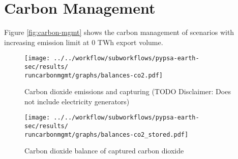 \section{Carbon Management}
\label{subsec:carbon_mgmt}

Figure \ref{fig:carbon-mgmt} shows the carbon management of scenarios with increasing emission limit at 0 TWh export volume.


\begin{figure*}[h!] %
    \centering
    \begin{subfigure}[b]{0.49\linewidth}
        \centering
        \texttt{[image: ../../workflow/subworkflows/pypsa-earth-sec/results/\\runcarbonmgmt/graphs/balances-co2.pdf]}
        \caption{Carbon dioxide emissions and capturing (TODO Disclaimer: Does not include electricity generators)}
        \label{fig:carbon-atmo}
    \end{subfigure}
    \hfill
    \begin{subfigure}[b]{0.49\linewidth}
        \centering
        \texttt{[image: ../../workflow/subworkflows/pypsa-earth-sec/results/\\runcarbonmgmt/graphs/balances-co2\_stored.pdf]}
        \caption{Carbon dioxide balance of captured carbon dioxide}
        \label{fig:carbon-store}
    \end{subfigure}
    \hfill
    \caption{Carbon dioxide \ref{fig:carbon-atmo} emissions and capturing as well as \ref{fig:carbon-store} management of captured carbon dioxide (TODO Disclaimer: run "carbonmgmt")}
    \label{fig:carbon-mgmt}
\end{figure*}


\clearpage